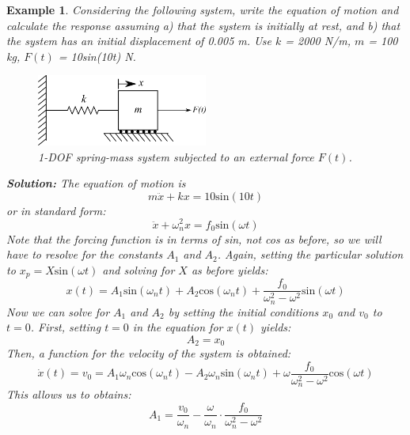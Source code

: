 \documentclass[12pt,letter]{article}
\newtheorem{ex}{Example}
\numberwithin{ex}{section} %
\newenvironment{example}{\begin{mdframed}[middlelinewidth=0.5mm]\begin{ex}\normalfont}{\end{ex}\end{mdframed}}
\numberwithin{re}{section} %
\begin{document}
\begin{example}
			Considering the following system, write the equation of motion and calculate the response assuming a) that the system is initially at rest, and b) that the system has an initial displacement of 0.005 m. Use $k$ = 2000 N/m, $m$ = 100 kg, $F(t)$ = 10sin(10t) N.
			\begin{figure}[H]
				\centering
				\includegraphics[width=0.5\textwidth]{../Figures/1-DOF-spring_mass_horizontal_forced.png}
				\caption{1-DOF spring-mass system subjected to an external force $F(t)$.}
			\end{figure}
			\noindent\textbf{Solution:} The equation of motion is
			\begin{equation}
				m\ddot{x}+kx=10\text{sin}(10t)
			\end{equation}
			or in standard form:
			\begin{equation}
				\ddot{x}+\omega_n^2x=f_0\text{sin}(\omega t)
			\end{equation}							
			Note that the forcing function is in terms of sin, not cos as before, so we will have to resolve for the constants $A_1$ and $A_2$. Again, setting the particular solution to $x_p=X\text{sin}(\omega t)$ and solving for $X$ as before yields:
			\begin{equation}
				x(t) = A_1\text{sin}(\omega_n t) + A_2\text{cos}(\omega_n t) + \frac{f_0}{\omega_n^2-\omega^2}\text{sin}(\omega t)
			\end{equation}	
			Now we can solve for $A_1$ and $A_2$ by setting the initial conditions $x_0$ and $v_0$ to $t=0$. First, setting $t=0$ in the equation for $x(t)$ yields:
			\begin{equation}
				A_2 = x_0
			\end{equation}	
			Then, a function for the velocity of the system is obtained: 
			\begin{equation}
				\dot{x}(t) = v_0 = A_1\omega_n\text{cos}(\omega_n t) - A_2\omega_n\text{sin}(\omega_n t) + \omega\frac{f_0}{\omega_n^2-\omega^2}\text{cos}(\omega t)
			\end{equation}				
			This allows us to obtains:
			\begin{equation}
				A_1 = \frac{v_0}{\omega_n}-\frac{\omega}{\omega_n}\cdot \frac{f_0}{\omega_n^2-\omega^2}

\end{equation}
\end{example}
\end{document}
